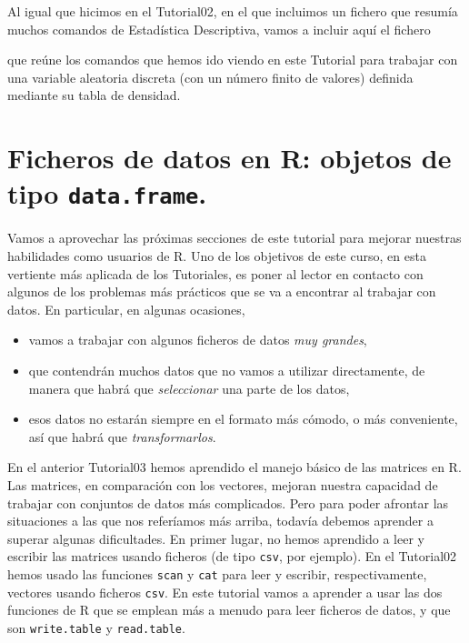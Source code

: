 \documentclass[10pt,a4paper]{article}\usepackage[]{graphicx}\usepackage[]{color}
\newcounter {cont01}
\begin{document}
Al igual que hicimos en el Tutorial02, en el que incluimos un fichero que resumía muchos comandos de Estadística Descriptiva, vamos a incluir aquí el fichero
\begin{center}
\end{center}
que reúne los comandos que hemos ido viendo en este Tutorial para trabajar con una variable aleatoria discreta (con un número finito de valores) definida mediante su tabla de densidad.



\section{Ficheros de datos en R: objetos de tipo {\tt data.frame}.}
\label{tut04:sec:FicherosDatosRObjetosDataFrame}
\label{tut04:sec:TablasMatricesDataFrames}

Vamos a aprovechar las próximas secciones de este tutorial para mejorar nuestras habilidades como usuarios de R.
Uno de los objetivos de este curso, en esta vertiente más aplicada de los Tutoriales, es poner al lector en contacto con algunos de los problemas más prácticos que se va a encontrar al trabajar con datos. En particular, en algunas ocasiones,
\begin{itemize}
  \item vamos a trabajar con algunos ficheros de datos {\em muy grandes},
  \item que contendrán muchos datos que no vamos a utilizar directamente, de manera que habrá que {\em seleccionar} una parte de los datos,
  \item esos datos no estarán siempre en el formato más cómodo, o más conveniente, así que habrá que {\em transformarlos}.
\end{itemize}
En el anterior Tutorial03 hemos aprendido el manejo básico de las matrices en R. Las matrices, en comparación con los vectores, mejoran nuestra capacidad de trabajar con conjuntos de datos más complicados. Pero para poder afrontar las situaciones a las que nos referíamos más arriba, todavía debemos aprender a superar algunas dificultades. En primer lugar, no hemos aprendido a leer y escribir las matrices usando ficheros (de tipo {\tt csv}, por ejemplo).  En el Tutorial02 hemos usado las funciones {\tt scan} y {\tt cat} para leer y escribir, respectivamente, vectores usando ficheros {\tt csv}. En este tutorial vamos a aprender a usar las dos funciones de R que se emplean más a menudo para leer ficheros de datos, y que son {\tt write.table} y {\tt read.table}.
\end{document}
